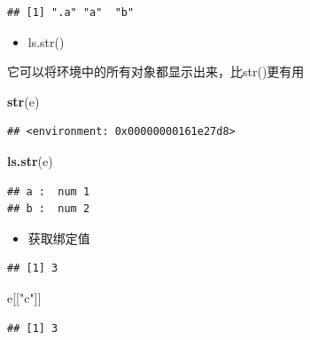 \documentclass[]{book}
\newenvironment{Shaded}{\begin{snugshade}}{\end{snugshade}}
\newcommand{\KeywordTok}[1]{\textcolor[rgb]{0.13,0.29,0.53}{\textbf{#1}}}
\newcommand{\DecValTok}[1]{\textcolor[rgb]{0.00,0.00,0.81}{#1}}
\newcommand{\StringTok}[1]{\textcolor[rgb]{0.31,0.60,0.02}{#1}}
\newcommand{\OperatorTok}[1]{\textcolor[rgb]{0.81,0.36,0.00}{\textbf{#1}}}
\newcommand{\NormalTok}[1]{#1}
\providecommand{\tightlist}{%
  \setlength{\itemsep}{0pt}\setlength{\parskip}{0pt}}
\begin{document}
\begin{verbatim}
## [1] ".a" "a"  "b"
\end{verbatim}

\begin{itemize}
\tightlist
\item
  ls.str()
\end{itemize}

它可以将环境中的所有对象都显示出来，比str()更有用

\begin{Shaded}
\begin{Highlighting}[]
\KeywordTok{str}\NormalTok{(e)}
\end{Highlighting}
\end{Shaded}

\begin{verbatim}
## <environment: 0x00000000161e27d8>
\end{verbatim}

\begin{Shaded}
\begin{Highlighting}[]
\KeywordTok{ls.str}\NormalTok{(e)}
\end{Highlighting}
\end{Shaded}

\begin{verbatim}
## a :  num 1
## b :  num 2
\end{verbatim}

\begin{itemize}
\tightlist
\item
  获取绑定值
\end{itemize}

\begin{Shaded}
\end{Shaded}

\begin{verbatim}
## [1] 3
\end{verbatim}

\begin{Shaded}
\begin{Highlighting}[]
\NormalTok{e[[}\StringTok{"c"}\NormalTok{]]}
\end{Highlighting}
\end{Shaded}

\begin{verbatim}
## [1] 3
\end{verbatim}
\end{document}
